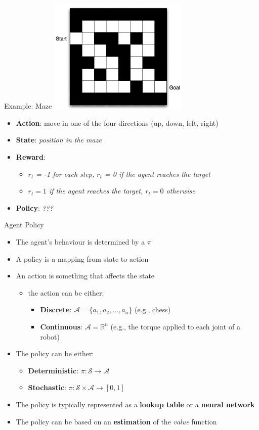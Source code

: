 \documentclass[presentation, 9pt]{beamer}\mode<presentation>{\usetheme{AMSBolognaFC}}
\begin{document}
\begin{frame}{Example: Maze}
\centering
\includegraphics[width=0.5\textwidth]{img/maze.png}

\begin{itemize}
	\item \textbf{Action}: move in one of the four directions (up, down, left, right)
	\item \textbf{State}: \emph{position in the maze}
	\item \textbf{Reward}: 
	\begin{itemize}
		\item \emph{$r_t$ = -1 for each step, $r_t$ = 0 if the agent reaches the target}
		\item \emph{$r_t = 1$ if the agent reaches the target, $r_t = 0$ otherwise}
	\end{itemize}
	\item \textbf{Policy}: \emph{???}
\end{itemize}
\end{frame}
\begin{frame}{Agent Policy}
\begin{itemize}
	\item The agent's behaviour is determined by a  $\pi$
	\item A policy is a mapping from state to action
	\item An action is something that affects the state
	\begin{itemize}
		\item the action can be either:
		\begin{itemize}
			\item \textbf{Discrete}: $\mathcal{A} = \{ a_1, a_2, \dots, a_n \}$ (e.g., chess)
			\item \textbf{Continuous}: $\mathcal{A} = \mathbb{R}^n$ (e.g., the torque applied to each joint of a robot)
		\end{itemize}
	\end{itemize}
	\item The policy can be either:
	\begin{itemize}
		\item \textbf{Deterministic}: $\pi: \mathcal{S} \rightarrow \mathcal{A}$
		\item \textbf{Stochastic}: $\pi: \mathcal{S} \times \mathcal{A} \rightarrow [0,1]$
	\end{itemize}
	\item The policy is typically represented as a \textbf{lookup table} or a \textbf{neural network}
	\item The policy can be based on an \textbf{estimation} of the \emph{value} function
\end{itemize}
\end{frame}
\end{document}
